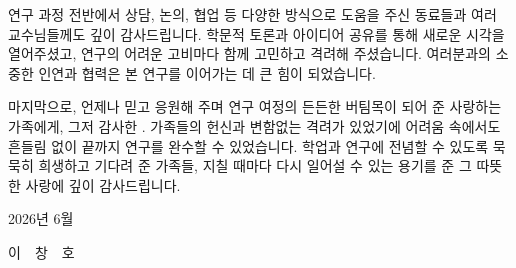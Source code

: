{연구 과정 전반에서 상담, 논의, 협업 등 다양한 방식으로 도움을 주신
동료들과 여러 교수님들께도 깊이 감사드립니다.
학문적 토론과 아이디어 공유를 통해 새로운 시각을 열어주셨고,
연구의 어려운 고비마다 함께 고민하고 격려해 주셨습니다.
여러분과의 소중한 인연과 협력은 본 연구를 이어가는 데 큰 힘이 되었습니다.

마지막으로, 언제나 믿고 응원해 주며 연구 여정의 든든한 버팀목이 되어 준
사랑하는 가족에게, 그저 감사한 .
가족들의 헌신과 변함없는 격려가 있었기에 어려움 속에서도 흔들림 없이
끝까지 연구를 완수할 수 있었습니다.
학업과 연구에 전념할 수 있도록 묵묵히 희생하고 기다려 준 가족들,
지칠 때마다 다시 일어설 수 있는 용기를 준 그 따뜻한 사랑에 깊이 감사드립니다.
\par}

\vspace{6mm}

\begin{center}
  2026년 6월
\end{center}

\vspace*{4mm}

\begin{flushright}
  \hspace*{-2cm}
  이\ \ 창\ \ 호
\end{flushright}
